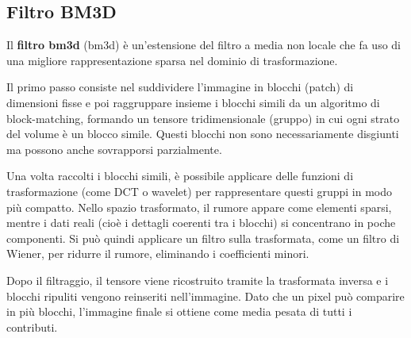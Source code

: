 \documentclass[../main.tex]{subfiles}
\begin{document}
	\subsection{Filtro BM3D}
	
	Il \textbf{filtro \acrshort{bm3d}} (\acrlong{bm3d}) è un'estensione del filtro a media non locale che fa uso di una migliore rappresentazione sparsa nel dominio di trasformazione\cite{manjon_2008}.
	
	Il primo passo consiste nel suddividere l'immagine in blocchi (patch) di dimensioni fisse e poi raggruppare insieme i blocchi simili da un algoritmo di block-matching, formando un tensore tridimensionale (gruppo) in cui ogni strato del volume è un blocco simile. Questi blocchi non sono necessariamente disgiunti ma possono anche sovrapporsi parzialmente.
	
	Una volta raccolti i blocchi simili, è possibile applicare delle funzioni di trasformazione (come DCT o wavelet) per rappresentare questi gruppi in modo più compatto. Nello spazio trasformato, il rumore appare come elementi sparsi, mentre i dati reali (cioè i dettagli coerenti tra i blocchi) si concentrano in poche componenti. Si può quindi applicare un filtro sulla trasformata, come un filtro di Wiener, per ridurre il rumore, eliminando i coefficienti minori.\cite{maggioni_2013}
	
	Dopo il filtraggio, il tensore viene ricostruito tramite la trasformata inversa e i blocchi ripuliti vengono reinseriti nell'immagine. Dato che un pixel può comparire in più blocchi, l'immagine finale si ottiene come media pesata di tutti i contributi.\cite{dabov_2007}
	
\end{document}
